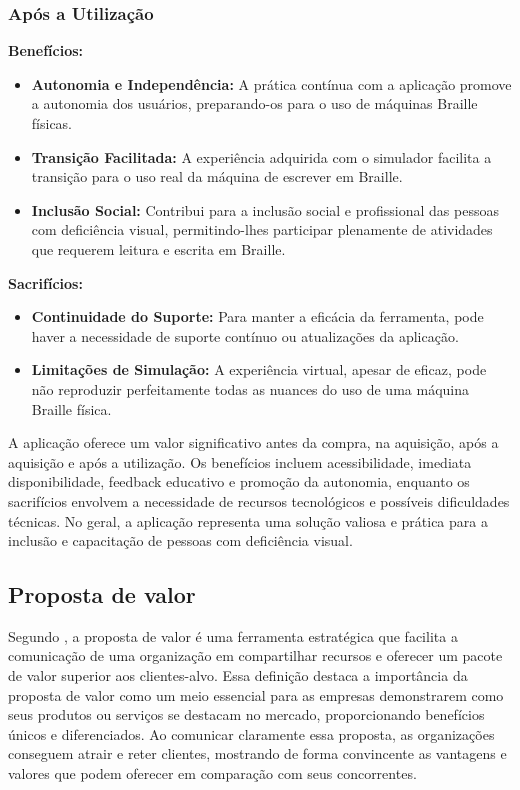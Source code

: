 \subsubsection{Após a Utilização}

\textbf{Benefícios:}

\begin{itemize}
    \item \textbf{Autonomia e Independência:} A prática contínua com a aplicação promove a autonomia dos usuários, preparando-os para o uso de máquinas Braille físicas.
    \item \textbf{Transição Facilitada:} A experiência adquirida com o simulador facilita a transição para o uso real da máquina de escrever em Braille.
    \item \textbf{Inclusão Social:} Contribui para a inclusão social e profissional das pessoas com deficiência visual, permitindo-lhes participar plenamente de atividades que requerem leitura e escrita em Braille.
\end{itemize}

\textbf{Sacrifícios:}

\begin{itemize}
    \item \textbf{Continuidade do Suporte:} Para manter a eficácia da ferramenta, pode haver a necessidade de suporte contínuo ou atualizações da aplicação.
    \item \textbf{Limitações de Simulação:} A experiência virtual, apesar de eficaz, pode não reproduzir perfeitamente todas as nuances do uso de uma máquina Braille física.
\end{itemize}

A aplicação oferece um valor significativo antes da compra, na aquisição, após a aquisição e após a utilização. Os benefícios incluem acessibilidade, imediata disponibilidade, feedback educativo e promoção da autonomia, enquanto os sacrifícios envolvem a necessidade de recursos tecnológicos e possíveis dificuldades técnicas. No geral, a aplicação representa uma solução valiosa e prática para a inclusão e capacitação de pessoas com deficiência visual.

\subsection{Proposta de valor}

Segundo \textcite{ARTICLE12}, a proposta de valor é uma ferramenta estratégica que facilita a comunicação de uma organização em compartilhar recursos e oferecer um pacote de valor superior aos clientes-alvo. Essa definição destaca a importância da proposta de valor como um meio essencial para as empresas demonstrarem como seus produtos ou serviços se destacam no mercado, proporcionando benefícios únicos e diferenciados. Ao comunicar claramente essa proposta, as organizações conseguem atrair e reter clientes, mostrando de forma convincente as vantagens e valores que podem oferecer em comparação com seus concorrentes.


